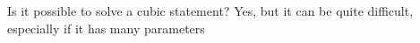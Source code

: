 {Is it possible to solve a cubic statement?}
{Yes, but it can be quite difficult, especially if it has many parameters}
